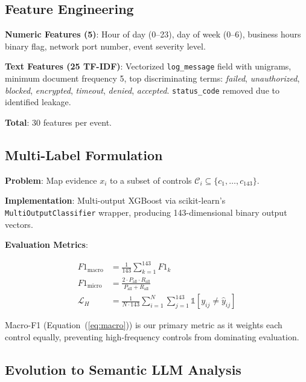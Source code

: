 \documentclass[futureinternet,article,submit,pdftex,moreauthors]{Definitions/mdpi}
\begin{document}
\subsection{Feature Engineering}

\textbf{Numeric Features (5)}: Hour of day (0--23), day of week (0--6), business hours
binary flag, network port number, event severity level.

\textbf{Text Features (25 TF-IDF)}: Vectorized \texttt{log\_message} field with unigrams,
minimum document frequency 5, top discriminating terms: \textit{failed},
\textit{unauthorized}, \textit{blocked}, \textit{encrypted}, \textit{timeout},
\textit{denied}, \textit{accepted}. \texttt{status\_code} removed due to identified leakage.

\textbf{Total}: 30 features per event.

\subsection{Multi-Label Formulation}

\textbf{Problem}: Map evidence $x_i$ to a subset of controls
$\mathcal{C}_i \subseteq \{c_1, \ldots, c_{143}\}$.

\textbf{Implementation}: Multi-output XGBoost via scikit-learn's
\texttt{MultiOutputClassifier} wrapper, producing 143-dimensional binary output vectors.

\textbf{Evaluation Metrics}:
\begin{linenomath}
\begin{align}
F1_{\text{macro}} &= \frac{1}{143}\sum_{k=1}^{143} F1_k \label{eq:macro}\\
F1_{\text{micro}} &= \frac{2 \cdot P_{\text{all}} \cdot R_{\text{all}}}{P_{\text{all}} + R_{\text{all}}} \label{eq:micro}\\
\mathcal{L}_{H} &= \frac{1}{N \cdot 143}\sum_{i=1}^{N}\sum_{j=1}^{143} \mathbb{1}[y_{ij} \neq \hat{y}_{ij}] \label{eq:hamming}
\end{align}
\end{linenomath}

Macro-F1 (Equation~(\ref{eq:macro})) is our primary metric as it weights each control
equally, preventing high-frequency controls from dominating evaluation.

\subsection{Evolution to Semantic LLM Analysis}
\end{document}
